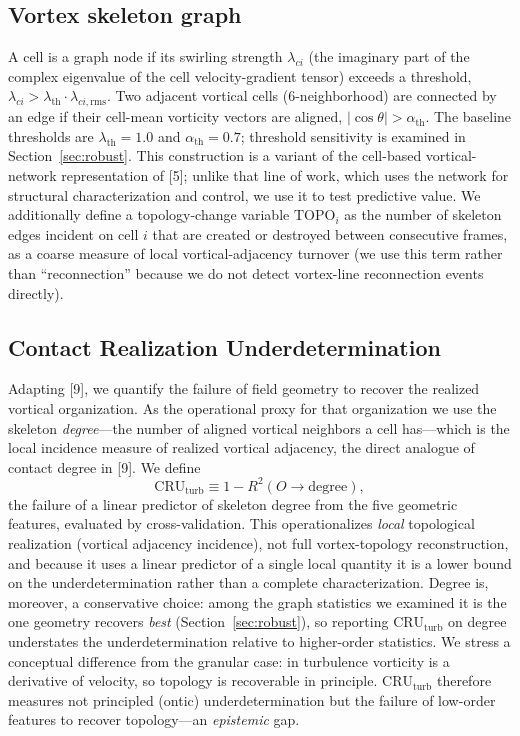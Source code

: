 \documentclass[11pt,a4paper]{article}
\begin{document}
\subsection{Vortex skeleton graph}
A cell is a graph node if its swirling strength $\lambda_{ci}$ (the imaginary part of the complex eigenvalue of the cell velocity-gradient tensor) exceeds a threshold, $\lambda_{ci} > \lambda_{\text{th}}\cdot\lambda_{ci,\text{rms}}$. Two adjacent vortical cells (6-neighborhood) are connected by an edge if their cell-mean vorticity vectors are aligned, $|\cos\theta| > \alpha_{\text{th}}$. The baseline thresholds are $\lambda_{\text{th}} = 1.0$ and $\alpha_{\text{th}} = 0.7$; threshold sensitivity is examined in Section~\ref{sec:robust}. This construction is a variant of the cell-based vortical-network representation of [5]; unlike that line of work, which uses the network for structural characterization and control, we use it to test predictive value. We additionally define a topology-change variable $\mathrm{TOPO}_i$ as the number of skeleton edges incident on cell $i$ that are created or destroyed between consecutive frames, as a coarse measure of local vortical-adjacency turnover (we use this term rather than ``reconnection'' because we do not detect vortex-line reconnection events directly).

\subsection{Contact Realization Underdetermination}
Adapting [9], we quantify the failure of field geometry to recover the realized vortical organization. As the operational proxy for that organization we use the skeleton \emph{degree}---the number of aligned vortical neighbors a cell has---which is the local incidence measure of realized vortical adjacency, the direct analogue of contact degree in [9]. We define
\begin{equation}
\mathrm{CRU}_{\text{turb}} \equiv 1 - R^2(O \rightarrow \text{degree}),
\end{equation}
the failure of a linear predictor of skeleton degree from the five geometric features, evaluated by cross-validation. This operationalizes \emph{local} topological realization (vortical adjacency incidence), not full vortex-topology reconstruction, and because it uses a linear predictor of a single local quantity it is a lower bound on the underdetermination rather than a complete characterization. Degree is, moreover, a conservative choice: among the graph statistics we examined it is the one geometry recovers \emph{best} (Section~\ref{sec:robust}), so reporting $\mathrm{CRU}_{\text{turb}}$ on degree understates the underdetermination relative to higher-order statistics. We stress a conceptual difference from the granular case: in turbulence vorticity is a derivative of velocity, so topology is recoverable in principle. $\mathrm{CRU}_{\text{turb}}$ therefore measures not principled (ontic) underdetermination but the failure of low-order features to recover topology---an \emph{epistemic} gap.
\end{document}
